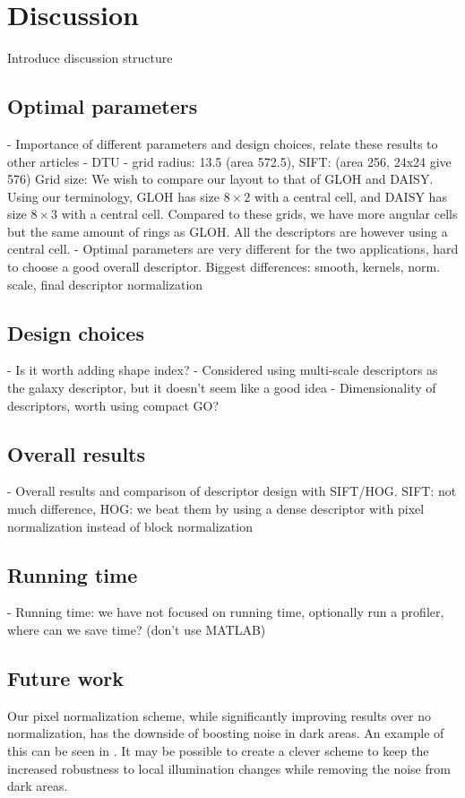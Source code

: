 \documentclass[thesis.tex]{subfiles}
\begin{document}
\chapter{Discussion}

Introduce discussion structure

\section{Optimal parameters}

- Importance of different parameters and design choices, relate these results to other articles
	- DTU
		- grid radius: 13.5 (area 572.5), SIFT: (area 256, 24x24 give 576)
		Grid size:
		We wish to compare our layout to that of GLOH and DAISY. Using our terminology, GLOH has size $8\times2$ with a central cell, and DAISY has size $8 \times 3$ with a central cell. Compared to these grids, we have more angular cells but the same amount of rings as GLOH. All the descriptors are however using a central cell.
- Optimal parameters are very different for the two applications, hard to choose a good overall descriptor. Biggest differences: smooth, kernels, norm. scale, final descriptor normalization

\section{Design choices}

- Is it worth adding shape index?
- Considered using multi-scale descriptors as the galaxy descriptor, but it doesn't seem like a good idea
- Dimensionality of descriptors, worth using compact GO?
		
\section{Overall results}

- Overall results and comparison of descriptor design with SIFT/HOG. SIFT: not much difference, HOG: we beat them by using a dense descriptor with pixel normalization instead of block normalization

\section{Running time}

- Running time: we have not focused on running time, optionally run a profiler, where can we save time? (don't use MATLAB)

\section{Future work} %
%
Our pixel normalization scheme, while significantly improving results over no normalization, has the downside of boosting noise in dark areas. An example of this can be seen in . It may be possible to create a clever scheme to keep the increased robustness to local illumination changes while removing the noise from dark areas.
\end{document}

